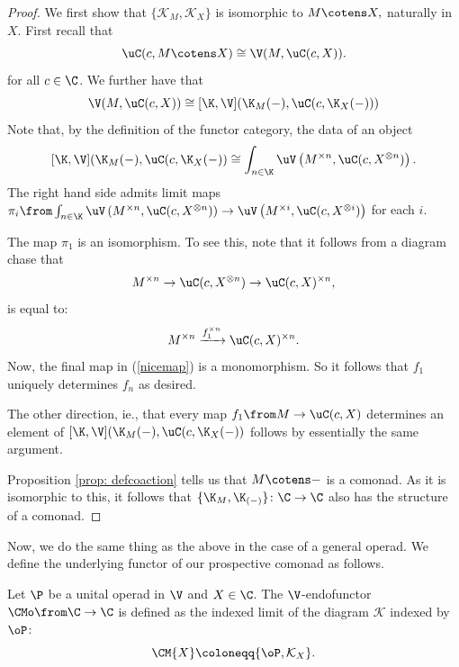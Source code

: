 \documentclass{tac}
\begin{document}
\begin{proof}
    We first show that
    $
    \{\mathcal K_M, \mathcal K_X\}
    $
    is isomorphic to $M\cotens X,$ naturally in $X$. First recall that
    \begin{equation*}
        \uC(c, M\cotens X) \cong \V(M,  \uC(c, X)).
    \end{equation*}
    for all $c\in \C$. We further have that 
    \begin{equation}
    \label{map}
    \V(M,  \uC(c, X)) \cong [\K,\V ](\K_M(-), \uC(c, \K_X(-)))
    \end{equation}
    Note that, by the definition of the functor category, the data of an object
    $$
    [\K,\V ](\K_M(-), \uC(c, \K_X(-)) \cong \int_{n \in \K} \uV \left( M^{\times n}, \uC(c, X^{\otimes n})\right).
    $$
    The right hand side admits limit maps $\pi_i \from  \int_{n \in \K} \uV \left( M^{\times n}, \uC(c, X^{\otimes n})\right) \to \uV \left( M^{\times i}, \uC(c, X^{\otimes i})\right)$ for each $i$.

    The map $\pi_1$ is an isomorphism. To see this, note that it follows from a diagram chase that
    \begin{equation}
    \label{nicemap}
       M^{\times n} \to \uC(c, X^{\otimes n}) \to \uC(c, X)^{\times n}, 
    \end{equation}
    is equal to: 
    $$
    M^{\times n} \xrightarrow{f_1^{\times n}} \uC(c, X)^{\times n}.
    $$
    Now, the final map in (\ref{nicemap}) is a monomorphism. So it follows that $f_1$ uniquely determines $f_n$ as desired.

    The other direction, ie., that every map $f_1\from M\to \uC(c, X)$ determines an element of $ [\K,\V ](\K_M(-), \uC(c, \K_X(-))$ follows by essentially the same argument. 
    
    Proposition \ref{prop: defcoaction} tells us that $M\cotens -$ is a comonad. As it is isomorphic to this, it follows that $\{\K_M, \K_{(-)}\} \colon \C \to \C$ also has the structure of a comonad.
\end{proof}
Now, we do the same thing as the above in the case of a general operad. We define the underlying functor of our prospective comonad as follows.
\begin{definition}
\label{def:comonad_object}
Let $\P$ be a unital operad in $\V$ and $X \in \C$. The $\V$-endofunctor $\CMo \from \C \to \C$ is defined as the indexed limit of the diagram $\mathcal K$ indexed by $\oP$:
$$\CM{X} \coloneqq \{\oP, \mathcal K_X \} . 
$$
\end{definition}
\end{document}
